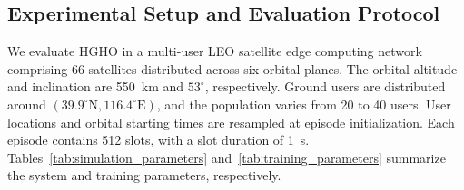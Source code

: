 \documentclass[journal]{IEEEtran}
\begin{document}
\subsection{Experimental Setup and Evaluation Protocol}
\label{subsec:experimental_setup}

We evaluate HGHO in a multi-user LEO satellite edge
computing network comprising 66 satellites distributed
across six orbital planes. The orbital altitude and
inclination are 550~km and $53^\circ$, respectively.
Ground users are distributed around
$(39.9^\circ\mathrm{N},116.4^\circ\mathrm{E})$, and the
population varies from 20 to 40 users.
User locations and orbital starting times are resampled
at episode initialization. Each episode contains
512 slots, with a slot duration of 1~s.
Tables~\ref{tab:simulation_parameters} and~\ref{tab:training_parameters}
summarize the system and training parameters, respectively.
\end{document}
